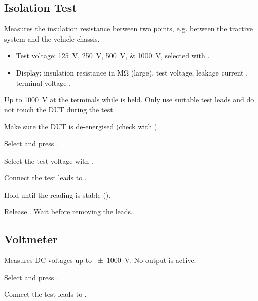 \subsection{Isolation Test}
\label{sec:mode_iso}
Measures the insulation resistance between two points, e.g. between the tractive system and the
vehicle chassis.
\begin{itemize}
    \item Test voltage: \qtylist{125;250;500;1000}{\volt}, selected with \enc.
    \item Display: insulation resistance in \unit{\mega\ohm} (large), test voltage, leakage
          current , terminal voltage .
\end{itemize}
\begin{danger}
    Up to \qty{1000}{\volt} at the terminals while  is held. Only use suitable test leads
    and do not touch the \ac{DUT} during the test.
\end{danger}
\begin{steps}
    \item Make sure the \ac{DUT} is de-energised (check with ).
    \item Select  and press .
    \item Select the test voltage with \enc.
    \item Connect the test leads to .
    \item Hold  until the reading is stable ().
    \item Release . Wait  before removing the leads.
\end{steps}

\subsection{Voltmeter}
\label{sec:mode_volt}
Measures DC voltages up to \qty{\pm1000}{\volt}. No output is active.
\begin{steps}
    \item Select  and press .
    \item Connect the test leads to .
\end{steps}


